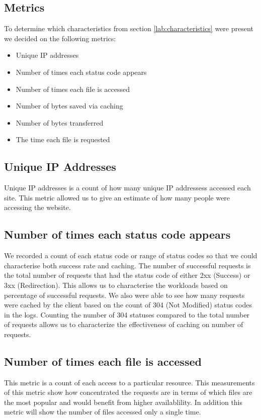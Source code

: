 \documentclass[10pt,conference]{IEEEtran}
\begin{document}
\subsection{Metrics}
To determine which characteristics from section \ref{lab:characteristics} were present we decided on the following metrics:
\begin{itemize}[noitemsep]
    \item Unique IP addresses
    \item Number of times each status code appears
    \item Number of times each file is accessed
    \item Number of bytes saved via caching
    \item Number of bytes transferred
    \item The time each file is requested
\end{itemize}

\subsection{Unique IP Addresses}
Unique IP addresses is a count of how many unique IP addressess accessed each site. This metric allowed us to give an estimate of how many people were accessing the website. 

\subsection{Number of times each status code appears}
We recorded a count of each status code or range of status codes so that we could characterise both success rate and caching.
The number of successful requests is the total number of requests that had the status code of either 2xx (Success) or 3xx (Redirection). This allows us to characterise the workloads based on percentage of successful requests.
We also were able to see how many requests were cached by the client based on the count of 304 (Not Modified) status codes in the logs. Counting the number of 304 statuses compared to the total number of requests allows us to characterize the effectiveness of caching on number of requests.

\subsection{Number of times each file is accessed}
This metric is a count of each access to a particular resource.
This measurements of this metric show how concentrated the requests are in terms of which files are the most popular and would benefit from higher availablility. In addition this metric will show the number of files accessed only a single time.
\end{document}

